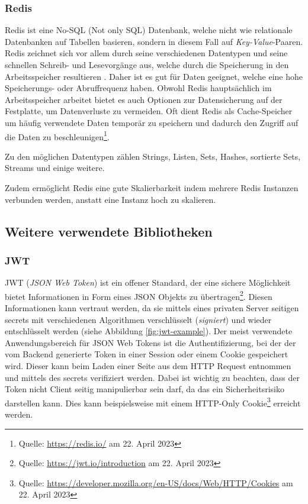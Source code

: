 \documentclass[a4paper,12pt]{report}
\begin{document}
        \subsubsection{Redis}
        \label{sec:redis}
        \begin{savenotes}
Redis ist eine No-SQL (Not only SQL) Datenbank, welche nicht wie relationale Datenbanken auf Tabellen basieren, sondern in diesem Fall auf \textit{Key-Value}-Paaren. Redis zeichnet sich vor allem durch seine verschiedenen Datentypen und seine schnellen Schreib- und Lesevorgänge aus, welche durch die Speicherung in den Arbeitsspeicher resultieren \cite{redis-book}. Daher ist es gut für Daten geeignet, welche eine hohe Speicherungs- oder Abruffrequenz haben. Obwohl Redis hauptsächlich im Arbeitsspeicher arbeitet bietet es auch Optionen zur Datensicherung auf der Festplatte, um Datenverluste zu vermeiden. Oft dient Redis als Cache-Speicher um häufig verwendete Daten temporär zu speichern und dadurch den Zugriff auf die Daten zu beschleunigen\footnote{Quelle: \url{https://redis.io/}\label{fn:redis} am 22. April 2023}. 
\end{savenotes}
Zu den möglichen Datentypen zählen Strings, Listen, Sets, Hashes, sortierte Sets, Streams und einige weitere. 	

 Zudem ermöglicht Redis eine gute Skalierbarkeit indem mehrere Redis Instanzen verbunden werden, anstatt eine Instanz hoch zu skalieren.
       
        \subsection{Weitere verwendete Bibliotheken}
        \label{sec:weiteres}
        \subsubsection{JWT}
        \label{sec:JWT}
JWT (\textit{JSON Web Token}) ist ein offener Standard, der eine sichere Möglichkeit bietet Informationen in Form eines JSON Objekts zu übertragen\footnote{Quelle: \url{https://jwt.io/introduction} am 22. April 2023}. Diesen Informationen kann vertraut werden, da sie mittels eines privaten Server seitigen secrets mit verschiedenen Algorithmen  verschlüsselt (\textit{signiert}) und wieder entschlüsselt werden (siehe Abbildung \ref{fig:jwt-example}). Der meist verwendete Anwendungsbereich für JSON Web Tokens ist die Authentifizierung, bei der der vom Backend generierte Token in einer Session oder einem Cookie gespeichert wird. Dieser kann beim Laden einer Seite aus dem HTTP Request entnommen und mittels des secrets verifiziert werden. Dabei ist wichtig zu beachten, dass der Token nicht Client seitig manipulierbar sein darf, da das ein Sicherheitsrisiko darstellen kann. Dies kann beispielsweise mit einem HTTP-Only Cookie\footnote{Quelle: \url{https://developer.mozilla.org/en-US/docs/Web/HTTP/Cookies} am 22. April 2023} erreicht werden.
 
\end{document}
